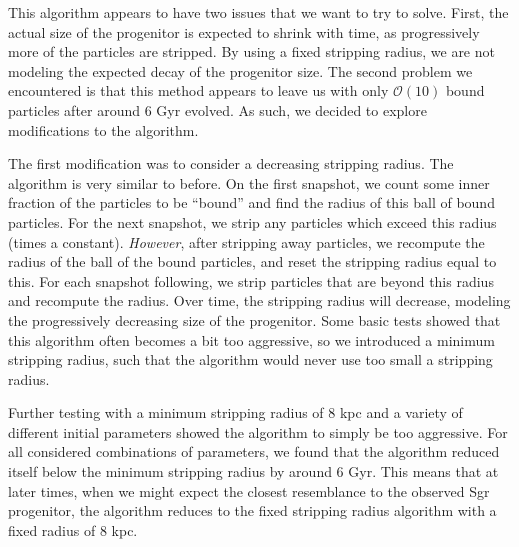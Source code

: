 This algorithm appears to have two issues that we want to try to solve.
First, the actual size of the progenitor is expected to shrink with time, as
progressively more of the particles are stripped.  By using a fixed stripping
radius, we are not modeling the expected decay of the progenitor size.  The
second problem we encountered is that this method appears to leave us with
only $\mathcal{O}(10)$ bound particles after around 6 Gyr evolved.  As such,
we decided to explore modifications to the algorithm.

The first modification was to consider a decreasing stripping radius.  The
algorithm is very similar to before.  On the first snapshot, we count some
inner fraction of the particles to be ``bound'' and find the radius of this
ball of bound particles.  For the next snapshot, we strip any particles
which exceed this radius (times a constant).  \textit{However}, after
stripping away particles, we recompute the radius of the ball of the bound
particles, and reset the stripping radius equal to this. For each snapshot
following, we strip particles that are beyond this radius and recompute the
radius.  Over time, the stripping radius will decrease, modeling the
progressively decreasing size of the progenitor.  Some basic tests showed that
this algorithm often becomes a bit too aggressive, so we introduced a minimum
stripping radius, such that the algorithm would never use too small a stripping
radius. 

Further testing with a minimum stripping radius of 8 kpc and a variety of
different initial parameters showed the algorithm to simply be too aggressive.
For all considered combinations of parameters, we found that the algorithm
reduced itself below the minimum stripping radius by around 6 Gyr.  This means
that at later times, when we might expect the closest resemblance to the
observed Sgr progenitor, the algorithm reduces to the fixed stripping radius
algorithm with a fixed radius of 8 kpc. 

